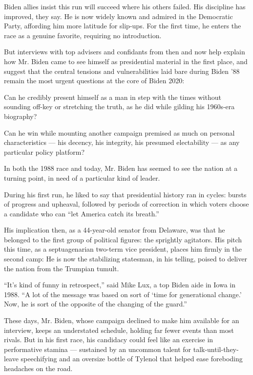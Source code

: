 Biden allies insist this run will succeed where his others failed. His
discipline has improved, they say. He is now widely known and admired in
the Democratic Party, affording him more latitude for slip-ups. For the
first time, he enters the race as a genuine favorite, requiring no
introduction.

But interviews with top advisers and confidants from then and now help
explain how Mr. Biden came to see himself as presidential material in
the first place, and suggest that the central tensions and
vulnerabilities laid bare during Biden '88 remain the most urgent
questions at the core of Biden 2020:

Can he credibly present himself as a man in step with the times without
sounding off-key or stretching the truth, as he did while gilding his
1960s-era biography?

Can he win while mounting another campaign premised as much on personal
characteristics --- his decency, his integrity, his presumed
electability --- as any particular policy platform?

In both the 1988 race and today, Mr. Biden has seemed to see the nation
at a turning point, in need of a particular kind of leader.

During his first run, he liked to say that presidential history ran in
cycles: bursts of progress and upheaval, followed by periods of
correction in which voters choose a candidate who can ``let America
catch its breath.''

His implication then, as a 44-year-old senator from Delaware, was that
he belonged to the first group of political figures: the sprightly
agitators. His pitch this time, as a septuagenarian two-term vice
president, places him firmly in the second camp: He is now the
stabilizing statesman, in his telling, poised to deliver the nation from
the Trumpian tumult.

``It's kind of funny in retrospect,'' said Mike Lux, a top Biden aide in
Iowa in 1988. ``A lot of the message was based on sort of `time for
generational change.' Now, he is sort of the opposite of the changing of
the guard.''

These days, Mr. Biden, whose campaign declined to make him available for
an interview, keeps an understated schedule, holding far fewer events
than most rivals. But in his first race, his candidacy could feel like
an exercise in performative stamina --- sustained by an uncommon talent
for talk-until-they-leave speechifying and an oversize bottle of Tylenol
that helped ease foreboding headaches on the road.

